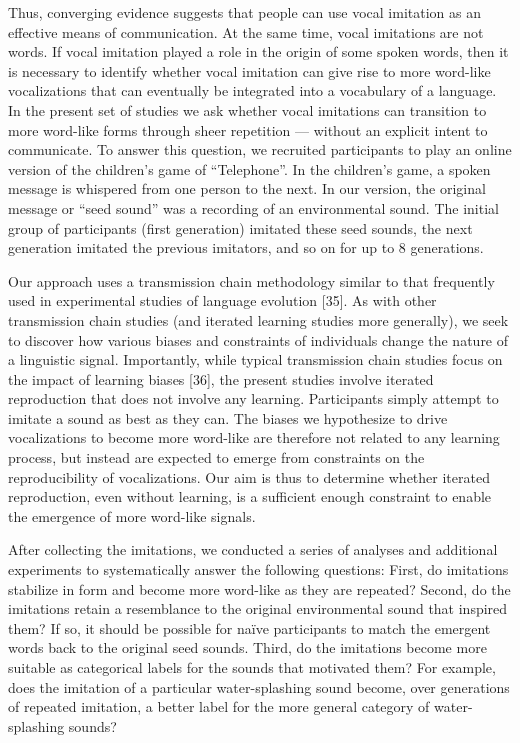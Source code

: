 \documentclass[english,floatsintext,man]{apa6}
\theoremstyle{definition}
\theoremstyle{definition}
\theoremstyle{definition}
\theoremstyle{remark}
\begin{document}
Thus, converging evidence suggests that people can use vocal imitation
as an effective means of communication. At the same time, vocal
imitations are not words. If vocal imitation played a role in the origin
of some spoken words, then it is necessary to identify whether vocal
imitation can give rise to more word-like vocalizations that can
eventually be integrated into a vocabulary of a language. In the present
set of studies we ask whether vocal imitations can transition to more
word-like forms through sheer repetition --- without an explicit intent
to communicate. To answer this question, we recruited participants to
play an online version of the children's game of \enquote{Telephone}. In
the children's game, a spoken message is whispered from one person to
the next. In our version, the original message or \enquote{seed sound}
was a recording of an environmental sound. The initial group of
participants (first generation) imitated these seed sounds, the next
generation imitated the previous imitators, and so on for up to 8
generations.

Our approach uses a transmission chain methodology similar to that
frequently used in experimental studies of language evolution {[}35{]}.
As with other transmission chain studies (and iterated learning studies
more generally), we seek to discover how various biases and constraints
of individuals change the nature of a linguistic signal. Importantly,
while typical transmission chain studies focus on the impact of learning
biases {[}36{]}, the present studies involve iterated reproduction that
does not involve any learning. Participants simply attempt to imitate a
sound as best as they can. The biases we hypothesize to drive
vocalizations to become more word-like are therefore not related to any
learning process, but instead are expected to emerge from constraints on
the reproducibility of vocalizations. Our aim is thus to determine
whether iterated reproduction, even without learning, is a sufficient
enough constraint to enable the emergence of more word-like signals.

After collecting the imitations, we conducted a series of analyses and
additional experiments to systematically answer the following questions:
First, do imitations stabilize in form and become more word-like as they
are repeated? Second, do the imitations retain a resemblance to the
original environmental sound that inspired them? If so, it should be
possible for naïve participants to match the emergent words back to the
original seed sounds. Third, do the imitations become more suitable as
categorical labels for the sounds that motivated them? For example, does
the imitation of a particular water-splashing sound become, over
generations of repeated imitation, a better label for the more general
category of water-splashing sounds?
\end{document}
